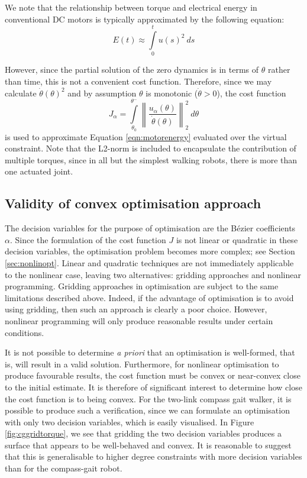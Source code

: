 We note that the relationship between torque and electrical energy in conventional DC motors is typically approximated by the following equation:
\begin{equation} \label{eqn:motorenergy}
	E(t) \approx \int\limits_0^t u(s)^2 ~ ds
\end{equation}

However, since the partial solution of the zero dynamics is in terms of $\theta$ rather than time, this is not a convenient cost function. Therefore, since we may calculate $\dot{\theta}(\theta)^2$ and by assumption $\theta$ is monotonic ($\dot{\theta}>0$), the cost function
\begin{equation}
	J_\alpha = \int\limits_{\theta_0}^{\theta^-} \left\lVert \frac{u_\alpha(\theta)}{\dot{\theta}(\theta)} \right\rVert_2^2 ~ d\theta
\end{equation}
is used to approximate Equation \ref{eqn:motorenergy} evaluated over the virtual constraint. Note that the L2-norm is included to encapsulate the contribution of multiple torques, since in all but the simplest walking robots, there is more than one actuated joint.

\subsection{Validity of convex optimisation approach}
The decision variables for the purpose of optimisation are the Bézier coefficients $\alpha$. Since the formulation of the cost function $J$ is not linear or quadratic in these decision variables, the optimisation problem becomes more complex; see Section \ref{sec:nonlinopt}. Linear and quadratic techniques are not immediately applicable to the nonlinear case, leaving two alternatives: gridding approaches and nonlinear programming. Gridding approaches in optimisation are subject to the same limitations described above. Indeed, if the advantage of optimisation is to avoid using gridding, then such an approach is clearly a poor choice. However, nonlinear programming will only produce reasonable results under certain conditions.

It is not possible to determine \textit{a priori} that an optimisation is well-formed, that is, will result in a valid solution. Furthermore, for nonlinear optimisation to produce favourable results, the cost function must be convex or near-convex close to the initial estimate. It is therefore of significant interest to determine how close the cost function is to being convex. For the two-link compass gait walker, it is possible to produce such a verification, since we can formulate an optimisation with only two decision variables, which is easily visualised. In Figure \ref{fig:cggridtorque}, we see that gridding the two decision variables produces a surface that appears to be well-behaved and convex. It is reasonable to suggest that this is generalisable to higher degree constraints with more decision variables than for the compass-gait robot.

